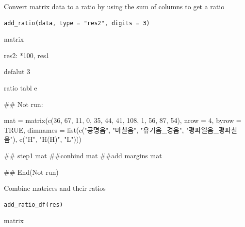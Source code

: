 \documentclass[a4paper]{book}
\begin{document}
%
\begin{Description}
Convert matrix data to a ratio by using the sum of columns to get a ratio
\end{Description}
%
\begin{Usage}
\begin{verbatim}
add_ratio(data, type = "res2", digits = 3)
\end{verbatim}
\end{Usage}
%
\begin{Arguments}
\begin{ldescription}
\item[\code{data}] matrix

\item[\code{type}] res2: *100, res1

\item[\code{digits}] defalut 3
\end{ldescription}
\end{Arguments}
%
\begin{Value}
ratio tabl e
\end{Value}
%
\begin{Examples}
\begin{ExampleCode}

## Not run: 


mat = matrix(c(36, 67, 11,
          0, 35, 44,
         41, 108, 1,
          56, 87, 54),
           nrow = 4, byrow = TRUE,
 dimnames = list(c("공명음", "마찰음",
                   "유기음_경음", "평파열음_평파찰음"),
                    c("H", "H(H)", "L")))

## step1
  mat %
##conbind
 mat %
##add margins
 mat %


## End(Not run)

\end{ExampleCode}
\end{Examples}
%
\begin{Description}
Combine matrices and their ratios
\end{Description}
%
\begin{Usage}
\begin{verbatim}
add_ratio_df(res)
\end{verbatim}
\end{Usage}
%
\begin{Arguments}
\begin{ldescription}
\item[\code{res}] matrix
\end{ldescription}
\end{Arguments}
\end{document}
